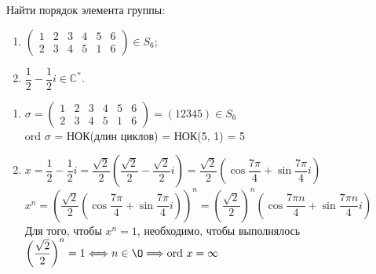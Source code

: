 \begin{problem}
    Найти порядок элемента группы:
    \begin{enumerate}[label=\alph*)]
        \item \( \begin{pmatrix}
            1 & 2 & 3 & 4 & 5 & 6 \\
            2 & 3 & 4 & 5 & 1 & 6
        \end{pmatrix} \in S_6\);
        \item \( \dfrac{1}{2} - \dfrac{1}{2}i \in \mathbb{C}^* \).
    \end{enumerate}
\end{problem}
\begin{solution}
    \begin{enumerate}[label=\alph*)]
        \item \( \sigma = \begin{pmatrix}
            1 & 2 & 3 & 4 & 5 & 6 \\
            2 & 3 & 4 & 5 & 1 & 6
        \end{pmatrix} = (12345) \in S_6\) \\
        ord \( \sigma \) = НОК(длин циклов) = НОК(5, 1) = 5
        \item \(x =  \dfrac{1}{2} - \dfrac{1}{2}i = \dfrac{\sqrt{2}}{2} \left( \dfrac{\sqrt{2}}{2} - \dfrac{\sqrt{2}}{2}i \right) =
        \dfrac{\sqrt{2}}{2} \left( \cos \dfrac{7 \pi}{4} + \sin \dfrac{7 \pi}{4} i \right)\) \\
        \( x^n = \left( \dfrac{\sqrt{2}}{2} \left( \cos \dfrac{7 \pi}{4} + \sin \dfrac{7 \pi}{4} i \right) \right)^n =
        \left( \dfrac{\sqrt{2}}{2} \right)^n \left( \cos \dfrac{7 \pi n}{4} + \sin \dfrac{7 \pi n}{4} i \right) \) \\
        Для того, чтобы \(x^n = 1\), необходимо, чтобы выполнялось \(\left( \dfrac{\sqrt{2}}{2} \right)^n = 1 \Longleftrightarrow n \in \O \Longrightarrow \text{ord} \ x = \infty\)

    \end{enumerate}
\end{solution}